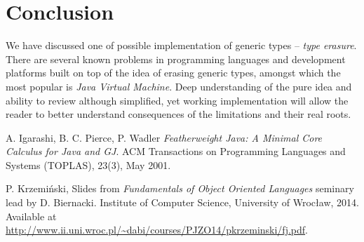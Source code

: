 \documentclass{article}[12pt]
\begin{document}
\section{Conclusion}

We have discussed one of possible implementation of generic
types -- \emph{type erasure}. There are several known problems
in programming languages and development platforms built on top
of the idea of erasing generic types, amongst which the most
popular is \emph{Java Virtual Machine}. Deep understanding of
the pure idea and ability to review although simplified,
yet working implementation will allow the reader to better
understand consequences of the limitations and their real roots. 

\begin{thebibliography}{1}

   A. Igarashi, B. C. Pierce, P. Wadler
  {\em Featherweight Java: A Minimal Core Calculus for Java and GJ}.
  ACM Transactions on Programming Languages and Systems (TOPLAS), 23(3), May 2001.

   P. Krzemiński, Slides from {\em Fundamentals of
  Object Oriented Languages} seminary lead by D. Biernacki.
  Institute of Computer Science, University of Wrocław, 2014.
  Available at
  \url{http://www.ii.uni.wroc.pl/~dabi/courses/PJZO14/pkrzeminski/fj.pdf}.

\end{thebibliography}
\end{document}
